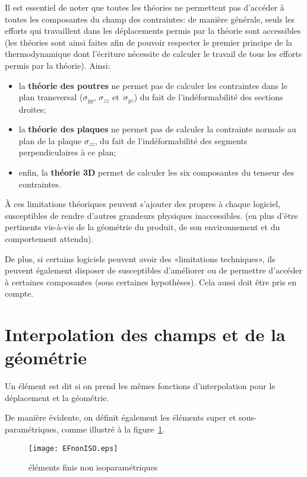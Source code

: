 \medskip
Il est essentiel de noter que toutes les théories ne permettent pas d'accéder à toutes les composantes du champ des contraintes: de manière générale, seuls les efforts qui travaillent dans les déplacements permis par la théorie sont accessibles (les théories sont ainsi faites afin de pouvoir respecter le premier principe de la thermodynamique dont l'écriture nécessite de calculer le travail de tous les efforts permis par la théorie). Ainsi:
\begin{itemize}
  \item la \textbf{théorie des poutres} ne permet pas de calculer les contraintes dans le plan transversal ($\sigma_{yy}$, $\sigma_{zz}$ et~$\sigma_{yz}$) du fait de l'indéformabilité des sections droites;
  \item la \textbf{théorie des plaques} ne permet pas de calculer la contrainte normale au plan de la plaque $\sigma_{zz}$, du fait de l'indéformabilité des segments perpendiculaires à ce plan;
  \item enfin, la \textbf{théorie 3D} permet de calculer les six composantes du tenseur des contraintes.
\end{itemize}

\medskip
À ces limitations théoriques peuvent s'ajouter des  propres à chaque logiciel, susceptibles de rendre d'autres grandeurs physiques inaccessibles.  (en plus d'être pertinents vis-à-vis de la géométrie du produit, de son environnement et du comportement attendu).

De plus, si certains logiciels peuvent avoir des «limitations techniques», ils peuvent également disposer de  susceptibles d'améliorer ou de permettre d'accéder à certaines composantes (sous certaines hypothèses). Cela aussi doit être pris en compte.


\medskip
\section{Interpolation des champs et de la géométrie}

Un élément est dit  si on prend les mêmes fonctions d'interpolation pour le déplacement et la géométrie.

De manière évidente, on définit également les éléments super et sous-paramétriques, comme illustré à la figure~\ref{EFnonISO}.
\begin{figure}[ht]
\centering
\texttt{[image: EFnonISO.eps]}
\caption{\label{EFnonISO} éléments finis non isoparamétriques}
\end{figure}

